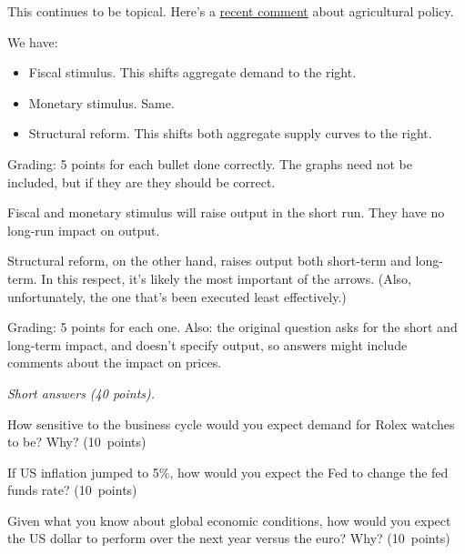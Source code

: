 \documentclass[letterpaper,12pt]{exam}
\begin{document}
\begin{questions}
\begin{solution}

This continues to be topical.
Here's a
\href{http://www.bloomberg.com/news/2013-12-12/abe-pushes-biggest-farm-revamp-since-macarthur-broke-landlords.html}
{recent comment} about agricultural policy.

\begin{parts}
\item We have:
\begin{itemize}
\item Fiscal stimulus. This shifts aggregate demand to the right.
\item Monetary stimulus. Same.
\item Structural reform. This shifts both aggregate supply curves to the right.
\end{itemize}
Grading:  5 points for each bullet done correctly.
The graphs need not be included, but if they are they should be correct.

\item Fiscal and monetary stimulus will raise output in the short run.
They have no long-run impact on output.

Structural reform, on the other hand, raises output both short-term and long-term.
In this respect, it's likely the most important of the arrows.
(Also, unfortunately, the one that's been executed least effectively.)

Grading: 5 points for each one.
Also:  the original question asks for the short and long-term impact, and doesn't
specify output, so answers might include comments about the impact on prices.
\end{parts}
\end{solution}


\item  {\it Short answers (40 points).\/}
\begin{parts}
\item  How sensitive to the business cycle would you expect demand for Rolex watches to be?
Why?
(10~points)

\item If US inflation jumped to 5\%, how would you expect 
the Fed to change the fed funds rate? 
(10~points)

\item  Given what you know about global economic conditions,
how would you expect the US dollar to perform over the next year versus the euro?  Why?
(10~points)


\end{parts}
\end{questions}
\end{document}
